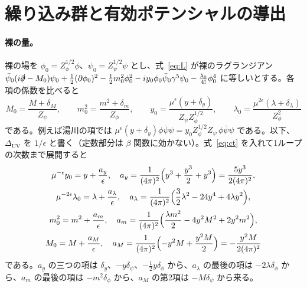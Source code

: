 \documentclass[a4paper,10pt]{ltjsarticle}
\begin{document}
\section{繰り込み群と有効ポテンシャルの導出}\label{app:rg}

\paragraph{裸の量。}裸の場を $\phi_0=Z_\phi^{1/2}\phi$、$\psi_0=Z_\psi^{1/2}\psi$ とし、式~\eqref{eq:L} が裸のラグランジアン $\bar\psi_0(i\slashed\partial-M_0)\psi_0+\frac12(\partial\phi_0)^2-\frac12m_0^2\phi_0^2-iy_0\phi_0\bar\psi_0\gamma^5\psi_0-\frac{\lambda_0}{4!}\phi_0^4$ に等しいとする。各項の係数を比べると
\begin{equation*}
M_0=\frac{M+\delta_M}{Z_\psi},\qquad m_0^2=\frac{m^2+\delta_m}{Z_\phi},\qquad
y_0=\frac{\mu^\epsilon(y+\delta_y)}{Z_\psi Z_\phi^{1/2}},\qquad \lambda_0=\frac{\mu^{2\epsilon}(\lambda+\delta_\lambda)}{Z_\phi^2}
\end{equation*}
である。例えば湯川の項では $\mu^\epsilon(y+\delta_y)\phi\bar\psi\psi=y_0Z_\phi^{1/2}Z_\psi\,\phi\bar\psi\psi$ である。以下、$\Delta_{\mathrm{UV}}$ を $1/\epsilon$ と書く（定数部分は $\beta$ 関数に効かない）。式~\eqref{eq:ct} を入れて1ループの次数まで展開すると
\begin{equation*}
\begin{gathered}
\mu^{-\epsilon}y_0=y+\frac{a_y}{\epsilon},\quad a_y=\frac{1}{(4\pi)^2}\Bigl(y^3+\frac{y^3}{2}+y^3\Bigr)=\frac{5y^3}{2(4\pi)^2},\\
\mu^{-2\epsilon}\lambda_0=\lambda+\frac{a_\lambda}{\epsilon},\quad a_\lambda=\frac{1}{(4\pi)^2}\Bigl(\frac32\lambda^2-24y^4+4\lambda y^2\Bigr),\\
m_0^2=m^2+\frac{a_m}{\epsilon},\quad a_m=\frac{1}{(4\pi)^2}\Bigl(\frac{\lambda m^2}{2}-4y^2M^2+2y^2m^2\Bigr),\\
M_0=M+\frac{a_M}{\epsilon},\quad a_M=\frac{1}{(4\pi)^2}\Bigl(-y^2M+\frac{y^2M}{2}\Bigr)=-\frac{y^2M}{2(4\pi)^2}
\end{gathered}
\end{equation*}
である。$a_y$ の三つの項は $\delta_y$、$-y\delta_\psi$、$-\frac12y\delta_\phi$ から、$a_\lambda$ の最後の項は $-2\lambda\delta_\phi$ から、$a_m$ の最後の項は $-m^2\delta_\phi$ から、$a_M$ の第2項は $-M\delta_\psi$ から来る。
\end{document}

